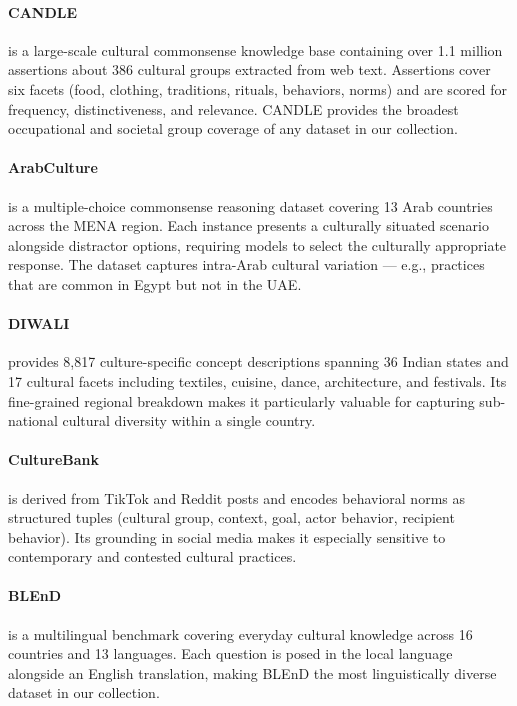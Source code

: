 \documentclass[11pt]{article}
\begin{document}
\paragraph{CANDLE} \cite{nguyen2023candle} is a large-scale cultural
commonsense knowledge base containing over 1.1 million assertions about
386 cultural groups extracted from web text.
Assertions cover six facets (food, clothing, traditions, rituals,
behaviors, norms) and are scored for frequency, distinctiveness, and
relevance.
CANDLE provides the broadest occupational and societal group coverage of
any dataset in our collection.

\paragraph{ArabCulture} \cite{sadallah2025arab} is a multiple-choice
commonsense reasoning dataset covering 13 Arab countries across the
MENA region.
Each instance presents a culturally situated scenario alongside distractor
options, requiring models to select the culturally appropriate response.
The dataset captures intra-Arab cultural variation — e.g., practices that
are common in Egypt but not in the UAE.

\paragraph{DIWALI} \cite{sahoo2025diwali} provides 8,817 culture-specific
concept descriptions spanning 36 Indian states and 17 cultural facets
including textiles, cuisine, dance, architecture, and festivals.
Its fine-grained regional breakdown makes it particularly valuable for
capturing sub-national cultural diversity within a single country.

\paragraph{CultureBank} \cite{shi2024culturebank} is derived from TikTok
and Reddit posts and encodes behavioral norms as structured tuples
(cultural group, context, goal, actor behavior, recipient behavior).
Its grounding in social media makes it especially sensitive to
contemporary and contested cultural practices.

\paragraph{BLEnD} \cite{myung2024blend} is a multilingual benchmark
covering everyday cultural knowledge across 16 countries and 13
languages.
Each question is posed in the local language alongside an English
translation, making BLEnD the most linguistically diverse dataset in our
collection.
\end{document}
